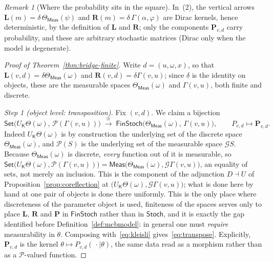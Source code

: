\documentclass[11pt,a4paper]{article}
\theoremstyle{plain}
\theoremstyle{definition}
\theoremstyle{remark}
\newtheorem{remark}[theorem]{Remark}
\newcommand{\cat}[1]{\mathsf{#1}}
\newcommand{\catK}{\cat{K}}
\newcommand{\Meas}{\cat{Meas}}
\newcommand{\Set}{\cat{Set}}
\newcommand{\Stoch}{\cat{Stoch}}
\newcommand{\FinStoch}{\cat{FinStoch}}
\newcommand{\G}{\mathcal{G}}
\newcommand{\Prb}{\mathcal{P}}
\newcommand{\del}{\delta}
\begin{document}
\begin{remark}[Where the probability sits in the square]\label{rem:squareshape}
In~(2), the vertical arrows $\mathbf{L}(m) = \del\,\Theta_\Meas(\psi)$ and
$\mathbf{R}(m) = \del\,\Gamma(\alpha,\varphi)$ are Dirac kernels, hence
deterministic, by the definition of $\mathbf{L}$ and $\mathbf{R}$; only the
components $\mathbf{P}_{v,d}$ carry probability, and these are arbitrary
stochastic matrices (Dirac only when the model is degenerate).
\end{remark}

\begin{proof}[Proof of Theorem~\ref{thm:bridge-finite}]
Write $d = (u,\omega,x)$, so that
$\mathbf{L}(v,d) = \del\Theta_\Meas(\omega)$ and
$\mathbf{R}(v,d) = \del\Gamma(v,u)$; since $\del$ is the identity on objects,
these are the measurable spaces $\Theta_\Meas(\omega)$ and $\Gamma(v,u)$,
both finite and discrete.

\emph{Step 1 (object level: transposition).} Fix $(v,d)$. We claim a bijection
\begin{equation}\label{eq:transpose}
\Set\bigl(U_\catK\Theta(\omega),\, \Prb(\Gamma(v,u))\bigr)
\;\xrightarrow{\ \cong\ }\;
\FinStoch\bigl(\Theta_\Meas(\omega),\, \Gamma(v,u)\bigr),
\qquad P_{v,d} \longmapsto \mathbf{P}_{v,d}.
\end{equation}
Indeed $U_\catK\Theta(\omega)$ is by construction the underlying set of the
discrete space $\Theta_\Meas(\omega)$, and $\Prb(S)$ is the underlying set of
the measurable space $\G S$. Because $\Theta_\Meas(\omega)$ is discrete,
\emph{every} function out of it is measurable, so
$\Set\bigl(U_\catK\Theta(\omega), \Prb(\Gamma(v,u))\bigr)
= \Meas\bigl(\Theta_\Meas(\omega), \G\Gamma(v,u)\bigr)$, an equality of
sets, not merely an inclusion. This is the component of the adjunction
$D \dashv U$ of Proposition~\ref{prop:coreflection} at
$\bigl(U_\catK\Theta(\omega), \G\Gamma(v,u)\bigr)$; what is done here by hand
at one pair of objects is done there uniformly. This is the only place where
discreteness of the parameter object is used, finiteness of the spaces
serves only to place $\mathbf{L}$, $\mathbf{R}$ and $\mathbf{P}$ in
$\FinStoch$ rather than in $\Stoch$, and it is exactly the gap
identified before Definition~\ref{def:mcbmodel}: in general one must
\emph{require} measurability in $\theta$. Composing with~\eqref{eq:kleisli}
gives~\eqref{eq:transpose}. Explicitly, $\mathbf{P}_{v,d}$ is the kernel
$\theta \mapsto P_{v,d}(\,\cdot \mid \theta)$, the same data read as a
morphism rather than as a $\Prb$-valued function.


\end{proof}
\end{document}
